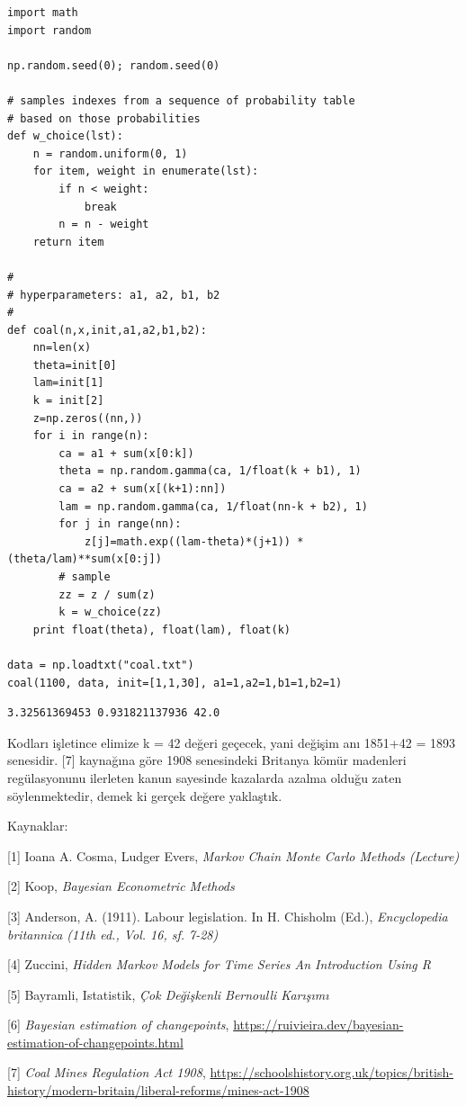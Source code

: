 \documentclass[12pt,fleqn]{article}\usepackage{../../common}
\begin{document}
\begin{verbatim}
import math
import random

np.random.seed(0); random.seed(0)

# samples indexes from a sequence of probability table
# based on those probabilities
def w_choice(lst):
    n = random.uniform(0, 1)
    for item, weight in enumerate(lst):
        if n < weight:
            break
        n = n - weight
    return item

#
# hyperparameters: a1, a2, b1, b2
#
def coal(n,x,init,a1,a2,b1,b2):
    nn=len(x)
    theta=init[0]
    lam=init[1]
    k = init[2]
    z=np.zeros((nn,))
    for i in range(n):
        ca = a1 + sum(x[0:k])
        theta = np.random.gamma(ca, 1/float(k + b1), 1) 
        ca = a2 + sum(x[(k+1):nn])
        lam = np.random.gamma(ca, 1/float(nn-k + b2), 1)
        for j in range(nn):
            z[j]=math.exp((lam-theta)*(j+1)) * (theta/lam)**sum(x[0:j])
        # sample
        zz = z / sum(z)
        k = w_choice(zz)
    print float(theta), float(lam), float(k)
                
data = np.loadtxt("coal.txt")
coal(1100, data, init=[1,1,30], a1=1,a2=1,b1=1,b2=1)
\end{verbatim}

\begin{verbatim}
3.32561369453 0.931821137936 42.0
\end{verbatim}

Kodları işletince elimize k = 42 değeri geçecek, yani değişim anı 1851+42 = 1893
senesidir. [7] kaynağına göre 1908 senesindeki Britanya kömür madenleri
regülasyonunu ilerleten kanun sayesinde kazalarda azalma olduğu zaten
söylenmektedir, demek ki gerçek değere yaklaştık.

Kaynaklar: 

[1] Ioana A. Cosma, Ludger Evers, {\em Markov Chain Monte Carlo Methods (Lecture)}

[2] Koop, {\em Bayesian Econometric Methods}

[3] Anderson, A. (1911). Labour legislation. In H. Chisholm (Ed.),
{\em Encyclopedia britannica (11th ed., Vol. 16, sf. 7-28)}

[4] Zuccini, {\em Hidden Markov Models for Time Series An Introduction Using R}

[5] Bayramli, Istatistik, {\em Çok Değişkenli Bernoulli Karışımı}

[6] {\em Bayesian estimation of changepoints},
    \url{https://ruivieira.dev/bayesian-estimation-of-changepoints.html}

[7] {\em Coal Mines Regulation Act 1908},
    \url{https://schoolshistory.org.uk/topics/british-history/modern-britain/liberal-reforms/mines-act-1908}
\end{document}

